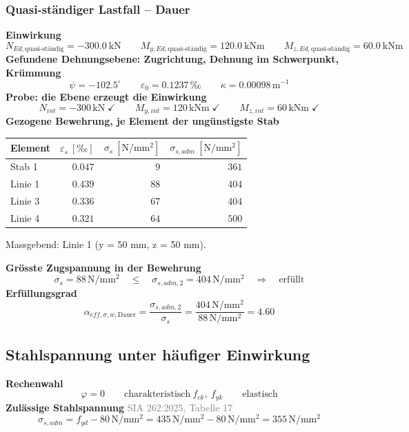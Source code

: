 \documentclass[11pt,a4paper]{article}
\newcommand{\normref}[1]{{\small\textcolor{gray}{#1}}}
\begin{document}
\subsubsection{Quasi-ständiger Lastfall – Dauer}
\noindent\textbf{Einwirkung}
\begin{equation*}
N_{Ed,\text{quasi-ständig}} = -300.0\ \mathrm{kN} \qquad M_{y,Ed,\text{quasi-ständig}} = 120.0\ \mathrm{kNm} \qquad M_{z,Ed,\text{quasi-ständig}} = 60.0\ \mathrm{kNm}
\end{equation*}
\noindent\textbf{Gefundene Dehnungsebene: Zugrichtung, Dehnung im Schwerpunkt, Krümmung}
\begin{equation*}
\psi = -102.5^\circ \qquad \varepsilon_0 = 0.1237\,\text{‰} \qquad \kappa = 0.00098\,\mathrm{m}^{-1}
\end{equation*}
\noindent\textbf{Probe: die Ebene erzeugt die Einwirkung}
\begin{equation*}
N_{int} = -300\,\mathrm{kN} \;\checkmark \qquad M_{y,int} = 120\,\mathrm{kNm} \;\checkmark \qquad M_{z,int} = 60\,\mathrm{kNm} \;\checkmark
\end{equation*}
\noindent\textbf{Gezogene Bewehrung, je Element der ungünstigste Stab}
\begin{longtable}{lrrr}
\hline
Element & $\varepsilon_s\ [‰]$ & $\sigma_s\ [\mathrm{N/mm^2}]$ & $\sigma_{s,adm}\ [\mathrm{N/mm^2}]$ \\
\hline
\endhead
Stab 1 & $0.047$ & $9$ & $361$ \\
Linie 1 & $0.439$ & $88$ & $404$ \\
Linie 3 & $0.336$ & $67$ & $404$ \\
Linie 4 & $0.321$ & $64$ & $500$ \\
\hline
\end{longtable}
Massgebend: Linie 1 (y = 50 mm, z = 50 mm).

\noindent\textbf{Grösste Zugspannung in der Bewehrung}
\begin{equation*}
\sigma_s = 88\,\mathrm{N}/\mathrm{mm}^{2} \quad \le \quad \sigma_{s,adm,2} = 404\,\mathrm{N}/\mathrm{mm}^{2} \quad \Rightarrow \quad \text{erfüllt}
\end{equation*}
\noindent\textbf{Erfüllungsgrad}
\begin{equation*}
\alpha_{eff,\sigma,w,\text{Dauer}} = \frac{\sigma_{s,adm,2}}{\sigma_s} = \frac{404\,\mathrm{N}/\mathrm{mm}^{2}}{88\,\mathrm{N}/\mathrm{mm}^{2}} = 4.60
\end{equation*}
\subsection{Stahlspannung unter häufiger Einwirkung}
\noindent\textbf{Rechenwahl}
\begin{equation*}
\varphi = 0 \qquad \text{charakteristisch}\ f_{ck},\ f_{yk} \qquad \text{elastisch}
\end{equation*}
\noindent\textbf{Zulässige Stahlspannung} \hfill \normref{SIA 262:2025, Tabelle 17}
\begin{equation*}
\sigma_{s,adm} = f_{yd} - 80\,\mathrm{N}/\mathrm{mm}^{2} = 435\,\mathrm{N}/\mathrm{mm}^{2} - 80\,\mathrm{N}/\mathrm{mm}^{2} = 355\,\mathrm{N}/\mathrm{mm}^{2}
\end{equation*}
\end{document}
